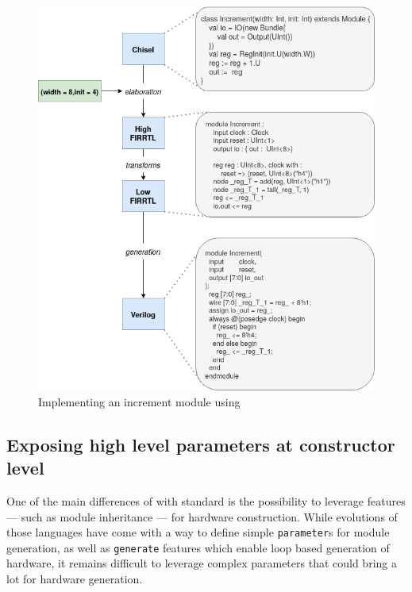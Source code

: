        \begin{figure}[h!]
            \centering
            \includegraphics[width=1.0\textwidth]{Figures/flow-example}
            \caption{Implementing an increment module using \chiselT}
            \label{app.chisel:fig.incr}
        \end{figure}

        \subsection*{Exposing high level parameters at constructor level}
            One of the main differences of  with standard  is the possibility to leverage  features --- such as module inheritance --- for hardware construction.
            While evolutions of those languages have come with a way to define simple \lstinline{parameter}s for module generation, as well as \lstinline{generate} features which enable loop based generation of hardware, it remains difficult to leverage complex parameters that could bring a lot for hardware generation.

